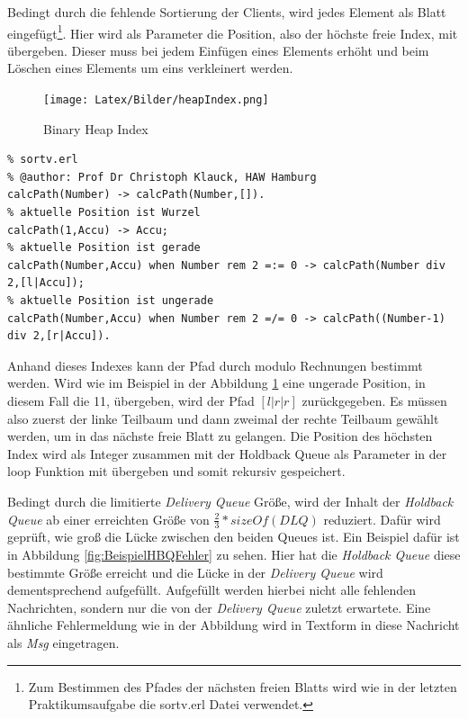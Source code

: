 Bedingt durch die fehlende Sortierung der Clients, wird jedes Element als Blatt eingefügt\footnote{Zum Bestimmen des Pfades der nächsten freien Blatts wird wie in der letzten Praktikumsaufgabe die sortv.erl Datei \cite{sortv} verwendet.}. Hier wird als Parameter die Position, also der höchste freie Index, mit übergeben. Dieser muss bei jedem Einfügen eines Elements erhöht und beim Löschen eines Elements um eins verkleinert werden. 

\begin{figure}[htbp]
\begin{center}
\texttt{[image: Latex/Bilder/heapIndex.png]}
\caption[Binary Heap Index]{Binary Heap Index\footnotemark}\label{fig:binHeapIndex}
\end{center}
\end{figure}

\newpage

\begin{lstlisting}
% sortv.erl
% @author: Prof Dr Christoph Klauck, HAW Hamburg 
calcPath(Number) -> calcPath(Number,[]).
% aktuelle Position ist Wurzel
calcPath(1,Accu) -> Accu;
% aktuelle Position ist gerade
calcPath(Number,Accu) when Number rem 2 =:= 0 -> calcPath(Number div 2,[l|Accu]);
% aktuelle Position ist ungerade
calcPath(Number,Accu) when Number rem 2 =/= 0 -> calcPath((Number-1) div 2,[r|Accu]).	
\end{lstlisting}

Anhand dieses Indexes kann der Pfad durch modulo Rechnungen bestimmt werden. Wird wie im Beispiel in der Abbildung \ref{fig:binHeapIndex} eine ungerade Position, in diesem Fall die 11, übergeben, wird der Pfad \textit{$[l|r|r]$} zurückgegeben. Es müssen also zuerst der linke Teilbaum und dann zweimal der rechte Teilbaum gewählt werden, um in das nächste freie Blatt zu gelangen.
Die Position des höchsten Index wird als Integer zusammen mit der Holdback Queue als Parameter in der loop Funktion mit übergeben und somit rekursiv gespeichert. 

Bedingt durch die limitierte \textit{Delivery Queue} Größe, wird der Inhalt der \textit{Holdback Queue} ab einer erreichten Größe von $\frac{2}{3}*sizeOf(DLQ)$ reduziert. Dafür wird geprüft, wie groß die Lücke zwischen den beiden Queues ist. Ein Beispiel dafür ist in Abbildung \ref{fig:BeispielHBQFehler} zu sehen. Hier hat die \textit{Holdback Queue} diese bestimmte Größe erreicht und die Lücke in der \textit{Delivery Queue} wird dementsprechend aufgefüllt. Aufgefüllt werden hierbei nicht alle fehlenden Nachrichten, sondern nur die von der \textit{Delivery Queue} zuletzt erwartete. Eine ähnliche Fehlermeldung wie in der Abbildung wird in Textform in diese Nachricht als \textit{Msg} eingetragen. 

